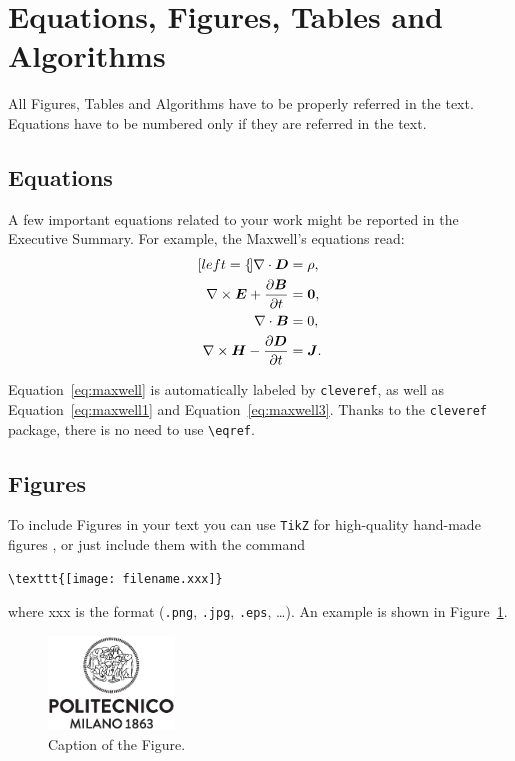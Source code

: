 \documentclass[11pt,a4paper,twocolumn]{article}
\begin{document}
\section{Equations, Figures, Tables and Algorithms}
\label{sec:equations_and_figures}
All Figures, Tables and Algorithms have to be properly referred in the text.
Equations have to be numbered only if they are referred in the text.
\subsection{Equations}
\label{sec_equations}
A few important equations related to your work might be reported in the Executive Summary. For example, the Maxwell's equations read:
\begin{subequations}
    \label{eq:maxwell}
    \begin{align}[left=\empheqlbrace]
    \nabla\cdot \bm{D} & = \rho, \label{eq:maxwell1} \\
    \nabla \times \bm{E} +  \frac{\partial \bm{B}}{\partial t} & = \bm{0}, \label{eq:maxwell2} \\
    \nabla\cdot \bm{B} & = 0, \label{eq:maxwell3} \\
    \nabla \times \bm{H} - \frac{\partial \bm{D}}{\partial t} &= \bm{J}. \label{eq:maxwell4}
    \end{align}
\end{subequations}

Equation~\eqref{eq:maxwell} is automatically labeled by \texttt{cleveref},
as well as Equation~\eqref{eq:maxwell1} and Equation~\eqref{eq:maxwell3}.
Thanks to the \verb|cleveref| package, there is no need to use \verb|\eqref|.

\subsection{Figures}
\label{sec:figures}
To include Figures in your text you can use \texttt{TikZ} for high-quality hand-made figures \cite{tikz},
or just include them with the command
\begin{verbatim}
\texttt{[image: filename.xxx]}
\end{verbatim}
where xxx is the format (\verb|.png|, \verb|.jpg|, \verb|.eps|, \dots).
An example is shown in Figure~\ref{fig:quadtree}.
\begin{figure}[H]
    \centering
    \includegraphics[width=0.3\textwidth]{logo_polimi_scritta.eps}
    \caption{Caption of the Figure.}
    \label{fig:quadtree}
\end{figure}
\end{document}
